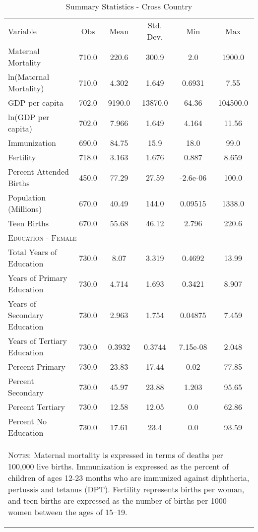 \begin{table}[htpb!]\begin{center}
\caption{Summary Statistics - Cross Country}\label{MMRtab:sumstats}
\begin{tabular}{lccccc}
&&&&& \\ \toprule Variable&Obs&Mean&Std. Dev.&Min&Max\\\midrule 
Maternal Mortality&710.0&220.6&300.9&2.0&1900.0\\
ln(Maternal Mortality)&710.0&4.302&1.649&0.6931&7.55\\
GDP per capita&702.0&9190.0&13870.0&64.36&104500.0\\
ln(GDP per capita)&702.0&7.966&1.649&4.164&11.56\\
Immunization&690.0&84.75&15.9&18.0&99.0\\
Fertility&718.0&3.163&1.676&0.887&8.659\\
Percent Attended Births&450.0&77.29&27.59&-2.6e-06&100.0\\
Population (Millions) &670.0&40.49&144.0&0.09515&1338.0\\
Teen Births&670.0&55.68&46.12&2.796&220.6\\
\midrule\multicolumn{6}{l}{\textsc{Education - Female}} \\ 
 Total Years of Education&730.0&8.07&3.319&0.4692&13.99\\
Years of Primary Education&730.0&4.714&1.693&0.3421&8.907\\
Years of Secondary Education&730.0&2.963&1.754&0.04875&7.459\\
Years of Tertiary Education&730.0&0.3932&0.3744&7.15e-08&2.048\\
Percent Primary&730.0&23.83&17.44&0.02&77.85\\
Percent Secondary&730.0&45.97&23.88&1.203&95.65\\
Percent Tertiary&730.0&12.58&12.05&0.0&62.86\\
Percent No Education&730.0&17.61&23.4&0.0&93.59\\
\midrule
\multicolumn{6}{p{12.5cm}}{\begin{footnotesize}\textsc{Notes:} Maternal mortality is expressed in terms of deaths per 100,000 live births. Immunization is expressed as the percent of children of ages 12-23 months who are immunized against diphtheria, pertussis and tetanus (DPT). Fertility represents births per woman, and teen births are expressed as the number of births per 1000 women between the ages of 15--19.\end{footnotesize}} \\ \bottomrule \end{tabular}\end{center}\end{table}